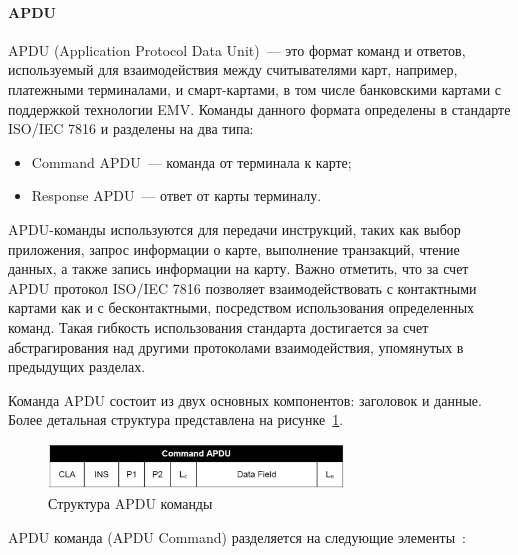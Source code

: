 \paragraph{APDU}

APDU (Application Protocol Data Unit)~--- это формат команд и ответов, используемый для взаимодействия между считывателями карт, например, платежными терминалами, и смарт-картами, в том числе банковскими картами с поддержкой технологии EMV.
Команды данного формата определены в стандарте ISO/IEC 7816 и разделены на два типа:

\begin{itemize}
    \item Command APDU~--- команда от терминала к карте;
    \item Response APDU~--- ответ от карты терминалу.
\end{itemize}


APDU-команды используются для передачи инструкций, таких как выбор приложения, запрос информации о карте, выполнение транзакций, чтение данных, а также запись информации на карту.
Важно отметить, что за счет APDU протокол ISO/IEC 7816 позволяет взаимодействовать с контактными картами как и с бесконтактными, посредством использования определенных команд.
Такая гибкость использования стандарта достигается за счет абстрагирования над другими протоколами взаимодействия, упомянутых в предыдущих разделах.

Команда APDU состоит из двух основных компонентов: заголовок и данные.
Более детальная структура представлена на рисунке~\ref{fig:apdu_com}.

\begin{figure}[H]
    \centering
    \includegraphics[width=0.7\textwidth]{images/research/apdu_com}
    \caption{\centering Структура APDU команды}
    \label{fig:apdu_com}
\end{figure}


APDU команда (APDU Command) разделяется на следующие элементы~\cite{medium_apdu2}:

